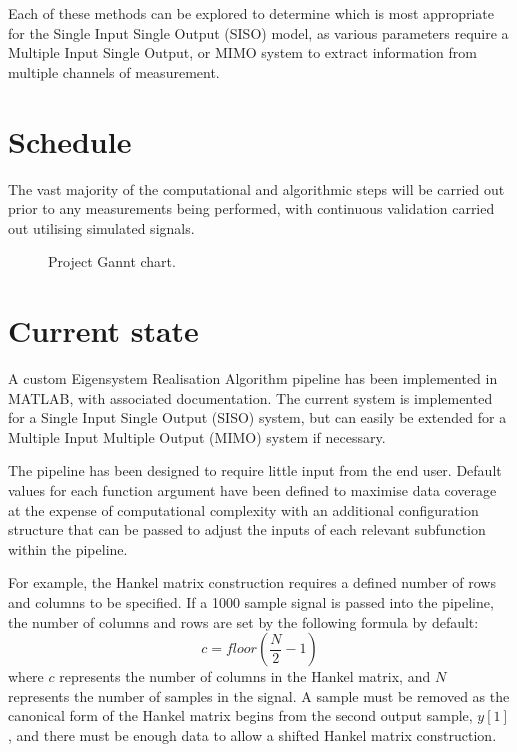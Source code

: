 Each of these methods can be explored to determine which is most appropriate for the Single Input Single Output (SISO) model, as various parameters require a Multiple Input Single Output, or MIMO system to extract information from multiple channels of measurement.

\section{Schedule}
\label{sec:schedule}
The vast majority of the computational and algorithmic steps will be carried out prior to any measurements being performed, with continuous validation carried out utilising simulated signals.
\begin{figure}
    \centering
    
    \caption{Project Gannt chart.}
    \label{fig:gantt}
\end{figure}

\section{Current state}
\label{sec:state}
A custom Eigensystem Realisation Algorithm pipeline has been implemented in MATLAB, with associated documentation. The current system is implemented for a Single Input Single Output (SISO) system, but can easily be extended for a Multiple Input Multiple Output (MIMO) system if necessary.

The pipeline has been designed to require little input from the end user. Default values for each function argument have been defined to maximise data coverage at the expense of computational complexity with an additional configuration structure that can be passed to adjust the inputs of each relevant subfunction within the pipeline.

For example, the Hankel matrix construction requires a defined number of rows and columns to be specified. If a 1000 sample signal is passed into the pipeline, the number of columns and rows are set by the following formula by default:
\begin{equation}
\label{eq:hankel-columns}
    c = floor \left(\frac{N}{2} - 1\right)
\end{equation}
where $c$ represents the number of columns in the Hankel matrix, and $N$ represents the number of samples in the signal. A sample must be removed as the canonical form of the Hankel matrix begins from the second output sample, $y[1]$, and there must be enough data to allow a shifted Hankel matrix construction.

